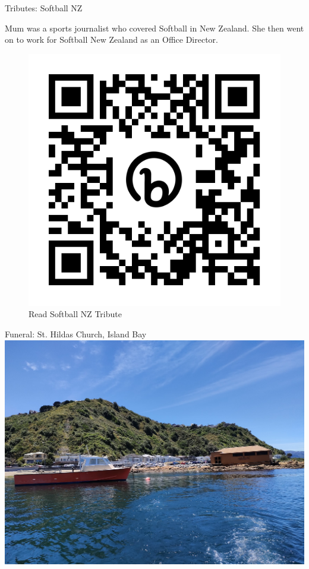 \documentclass{beamer}
\begin{document}
\begin{frame}{Tributes: Softball NZ}
\vspace{0.2cm}

Mum was a sports journalist who covered Softball in New Zealand. She then went on to work for Softball New Zealand as an Office Director.

\vspace{1cm}

\begin{figure}
    \centering
    \includegraphics[height=0.3\textheight]{assets/qr/softball_nz_qr.png}
    \caption{Read Softball NZ Tribute}
    \label{fig:qr-code}
\end{figure}
\end{frame}

\begin{frame}{Funeral: St. Hildas Church, Island Bay}
    \centering
    \includegraphics[width=\linewidth]{assets/island-bay.jpg}
\end{frame}
\end{document}
